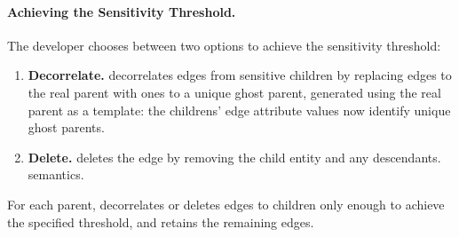 
\paragraph{Achieving the Sensitivity Threshold.}
The developer chooses between two options to achieve the sensitivity threshold: 
\begin{enumerate}
    \item \textbf{Decorrelate.}
    \sys decorrelates edges from sensitive children by replacing edges to the real parent with
        ones to a unique ghost parent, generated using the real parent as a template:
        the childrens' edge attribute values now identify unique ghost parents. 

\item \textbf{Delete.}
    \sys deletes the edge by removing the child entity and any descendants. 
    semantics.%
\end{enumerate}

For each parent, \sys decorrelates or deletes edges to children only enough to achieve the specified
threshold, and retains the remaining edges. 

\iffalse
